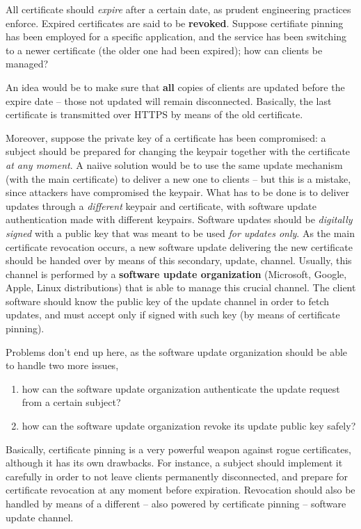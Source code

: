 \documentclass[10pt]{extbook}
\begin{document}
All certificate should \emph{expire} after a certain date, as prudent
engineering practices enforce. Expired certificates are said to be
\textbf{revoked}. Suppose certifiate pinning has been employed for
a specific application, and the service has been switching to a newer
certificate (the older one had been expired); how can clients be managed?

An idea would be to make sure that \textbf{all} copies of clients are updated
before the expire date -- those not updated will remain disconnected.
Basically, the last certificate is transmitted over HTTPS by means of the old
certificate.

Moreover, suppose the private key of a certificate has been compromised: a
subject should be prepared for changing the keypair together with the
certificate \emph{at any moment}. A naiive solution would be to use the same
update mechanism (with the main certificate) to deliver a new one to clients --
but this is a mistake, since attackers have compromised the keypair. What has
to be done is to deliver updates through a \emph{different} keypair and
certificate, with software update authentication made with different keypairs.
Software updates should be \emph{digitally signed} with a public key that was
meant to be used \emph{for updates only}. As the main certificate revocation
occurs, a new software update delivering the new certificate should be handed
over by means of this secondary, update, channel. Usually, this channel is
performed by a \textbf{software update organization} (Microsoft, Google, Apple,
Linux distributions) that is able to manage this crucial channel. The client
software should know the public key of the update channel in order to fetch
updates, and must accept only if signed with such key (by means of certificate
pinning).

Problems don't end up here, as the software update organization should be able to handle two more issues,
\begin{enumerate}
    \item how can the software update organization authenticate the update request
        from a certain subject?
    \item how can the software update organization revoke its update public key
        safely?
\end{enumerate}

Basically, certificate pinning is a very powerful weapon against rogue
certificates, although it has its own drawbacks. For instance, a subject should
implement it carefully in order to not leave clients permanently disconnected,
and prepare for certificate revocation at any moment before expiration.
Revocation should also be handled by means of a different -- also powered by
certificate pinning -- software update channel.
\end{document}
